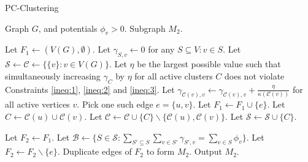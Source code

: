 \begin{algorithm}[H]
\caption{PC-Clustering}
\label{algorithm:pc-clustering}
\begin{algorithmic}[1]

\Require Graph \(G\), and potentials \(\phi_v > 0\).
\Ensure Subgraph \(M_2\).

\State Let \(F_1 \gets (V(G), \emptyset)\).
\State Let \(\gamma_{S, v} \gets 0\) for any \(S \subseteq V : v \in S\).
\State Let \(\mathcal{S} \gets \mathcal{C} \gets \{\{v\}: v \in V(G)\}\).
 \label{alg:line-while}
    \State Let \(\eta\) be the largest possible value such that simultaneously increasing \(\gamma_C\) by \(\eta\) for all active clusters \(C\) does not violate Constraints \eqref{ineq:1}, \eqref{ineq:2} and \eqref{ineq:3}.
    \State Let \(\gamma_{\mathcal{C}(v), v} \gets \gamma_{\mathcal{C}(v), v} + \frac{\eta}{\kappa(\mathcal{C}(v))}\) for all active vertices \(v\).
        \State Pick one such edge \(e = \{u, v\}\).
        \State Let \(F_1 \gets F_1 \cup \{e\}\).
        \State Let \(C \gets \mathcal{C}(u) \cup \mathcal{C}(v)\).
        \State Let \(\mathcal{C} \gets \mathcal{C} \cup \{C\} \backslash \{ \mathcal{C}(u), \mathcal{C}(v) \}\).
        \State Let \(\mathcal{S} \gets \mathcal{S} \cup \{C\}\).
    \EndIf
\EndWhile

\State Let \(F_2 \gets F_1\).
\State Let \(\mathcal{B} \gets \{S \in \mathcal{S} : \sum_{S' \subseteq S} \sum_{v \in S'} \gamma_{S', v} = \sum_{v \in S} \phi_v\}\).
    \State Let \(F_2 \gets F_2 \backslash \{e\}\).
\EndWhile
\State Duplicate edges of \(F_2\) to form \(M_2\).
\State Output \(M_2\).

\end{algorithmic}
\end{algorithm}

